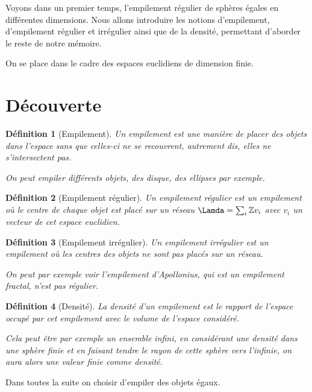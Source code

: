 \documentclass{book}
\newtheorem{definition}{Définition}
\begin{document}
Voyons dans un premier temps, l'empilement régulier de sphères égales en différentes dimensions.
Nous allons introduire les notions d'empilement, d'empilement régulier et irrégulier ainsi que de la densité, permettant d'aborder le reste de notre mémoire.
\cite{empil1}

On se place dans le cadre des espaces euclidiens de dimension finie.

\section{Découverte}
\begin{definition}[Empilement]
Un empilement est une manière de placer des objets dans l'espace sans que celles-ci ne se recouvrent, autrement dis, elles ne s'intersectent pas. 

On peut empiler différents objets, des disque, des ellipses par exemple.
\end{definition}

\begin{definition}[Empilement régulier]
Un empilement régulier est un empilement où le centre de chaque objet est placé sur un réseau $\Lamda = \sum_i \mathbb{Z} v_i$ avec $v_i$ un vecteur de cet espace euclidien.
\end{definition}

\begin{definition}[Empilement irrégulier]
Un empilement irrégulier est un empilement où les centres des objets ne sont pas placés sur un réseau.

On peut par exemple voir l'empilement d'Apollonius, qui est un empilement fractal, n'est pas régulier.
\end{definition}

\begin{definition}[Densité]
La densité d'un empilement est le rapport de l'espace occupé par cet empilement avec le volume de l'espace considéré.

Cela peut être par exemple un ensemble infini, en considérant une densité dans une sphère finie et en faisant tendre le rayon de cette sphère vers l'infinie, on aura alors une valeur finie comme densité.
\end{definition}

Dans toutes la suite on choisir d'empiler des objets égaux.
\end{document}
